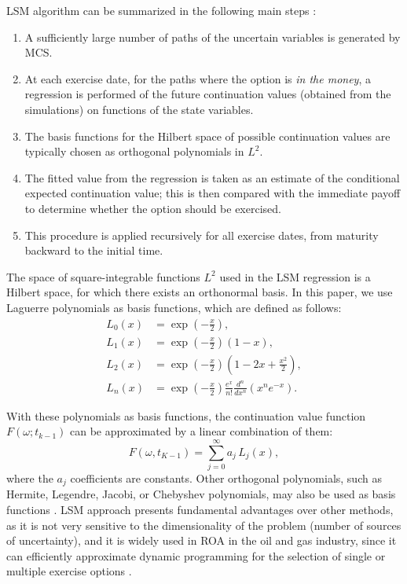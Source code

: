 \documentclass[pdflatex,sn-basic]{sn-jnl}%
\theoremstyle{thmstyleone}%
\theoremstyle{thmstyletwo}%
\theoremstyle{thmstylethree}%
\begin{document}
LSM algorithm can be summarized in the following main steps \citep{ref14, ref15}:

\begin{enumerate}[label=(\roman*)]
\item A sufficiently large number of paths of the uncertain variables is generated by MCS.
\item At each exercise date, for the paths where the option is \textit{in the money}, a regression is performed of the future continuation values (obtained from the simulations) on functions of the state variables.
\item The basis functions for the Hilbert space of possible continuation values are typically chosen as orthogonal polynomials in $L^2$.
\item The fitted value from the regression is taken as an estimate of the conditional expected continuation value; this is then compared with the immediate payoff to determine whether the option should be exercised.
\item This procedure is applied recursively for all exercise dates, from maturity backward to the initial time.
\end{enumerate}

The space of square-integrable functions $L^2$ used in the LSM regression is a Hilbert space, for which there exists an orthonormal basis. In this paper, we use Laguerre polynomials as basis functions, which are defined as follows:
\begin{align}
L_0(x) &= \exp\left(-\frac{x}{2}\right), \\
L_1(x) &= \exp\left(-\frac{x}{2}\right) (1 - x), \\
L_2(x) &= \exp\left(-\frac{x}{2}\right) \left(1 - 2x + \frac{x^2}{2}\right), \\
L_n(x) &= \exp\left(-\frac{x}{2}\right) \frac{e^{x}}{n!} \frac{d^n}{dx^n} \left( x^n e^{-x} \right).
\end{align}

With these polynomials as basis functions, the continuation value function $F(\omega; t_{k-1})$ can be approximated by a linear combination of them:
\begin{equation}
F(\omega, t_{K-1}) = \sum_{j=0}^{\infty} a_j\, L_j(x),
\end{equation}
where the $a_j$ coefficients are constants. Other orthogonal polynomials, such as Hermite, Legendre, Jacobi, or Chebyshev polynomials, may also be used as basis functions \citep{ref14}. LSM approach presents fundamental advantages over other methods, as it is not very sensitive to the dimensionality of the problem (number of sources of uncertainty), and it is widely used in ROA in the oil and gas industry, since it can efficiently approximate dynamic programming for the selection of single or multiple exercise options \citep{ref15}.
\end{document}
